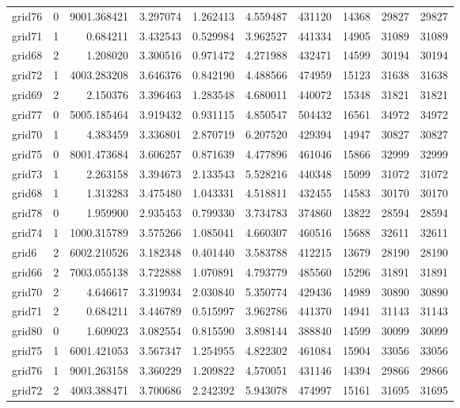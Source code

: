 \begin{longtable}{|l|r|r|r|r|r|r|r|r|r|}
grid76 & 0 & 9001.368421 & 3.297074 & 1.262413 & 4.559487 & 431120 & 14368 & 29827 & 29827 \\
grid71 & 1 & 0.684211 & 3.432543 & 0.529984 & 3.962527 & 441334 & 14905 & 31089 & 31089 \\
grid68 & 2 & 1.208020 & 3.300516 & 0.971472 & 4.271988 & 432471 & 14599 & 30194 & 30194 \\
grid72 & 1 & 4003.283208 & 3.646376 & 0.842190 & 4.488566 & 474959 & 15123 & 31638 & 31638 \\
grid69 & 2 & 2.150376 & 3.396463 & 1.283548 & 4.680011 & 440072 & 15348 & 31821 & 31821 \\
grid77 & 0 & 5005.185464 & 3.919432 & 0.931115 & 4.850547 & 504432 & 16561 & 34972 & 34972 \\
grid70 & 1 & 4.383459 & 3.336801 & 2.870719 & 6.207520 & 429394 & 14947 & 30827 & 30827 \\
grid75 & 0 & 8001.473684 & 3.606257 & 0.871639 & 4.477896 & 461046 & 15866 & 32999 & 32999 \\
grid73 & 1 & 2.263158 & 3.394673 & 2.133543 & 5.528216 & 440348 & 15099 & 31072 & 31072 \\
grid68 & 1 & 1.313283 & 3.475480 & 1.043331 & 4.518811 & 432455 & 14583 & 30170 & 30170 \\
grid78 & 0 & 1.959900 & 2.935453 & 0.799330 & 3.734783 & 374860 & 13822 & 28594 & 28594 \\
grid74 & 1 & 1000.315789 & 3.575266 & 1.085041 & 4.660307 & 460516 & 15688 & 32611 & 32611 \\
grid6 & 2 & 6002.210526 & 3.182348 & 0.401440 & 3.583788 & 412215 & 13679 & 28190 & 28190 \\
grid66 & 2 & 7003.055138 & 3.722888 & 1.070891 & 4.793779 & 485560 & 15296 & 31891 & 31891 \\
grid70 & 2 & 4.646617 & 3.319934 & 2.030840 & 5.350774 & 429436 & 14989 & 30890 & 30890 \\
grid71 & 2 & 0.684211 & 3.446789 & 0.515997 & 3.962786 & 441370 & 14941 & 31143 & 31143 \\
grid80 & 0 & 1.609023 & 3.082554 & 0.815590 & 3.898144 & 388840 & 14599 & 30099 & 30099 \\
grid75 & 1 & 6001.421053 & 3.567347 & 1.254955 & 4.822302 & 461084 & 15904 & 33056 & 33056 \\
grid76 & 1 & 9001.263158 & 3.360229 & 1.209822 & 4.570051 & 431146 & 14394 & 29866 & 29866 \\
grid72 & 2 & 4003.388471 & 3.700686 & 2.242392 & 5.943078 & 474997 & 15161 & 31695 & 31695 \\

\end{longtable}

